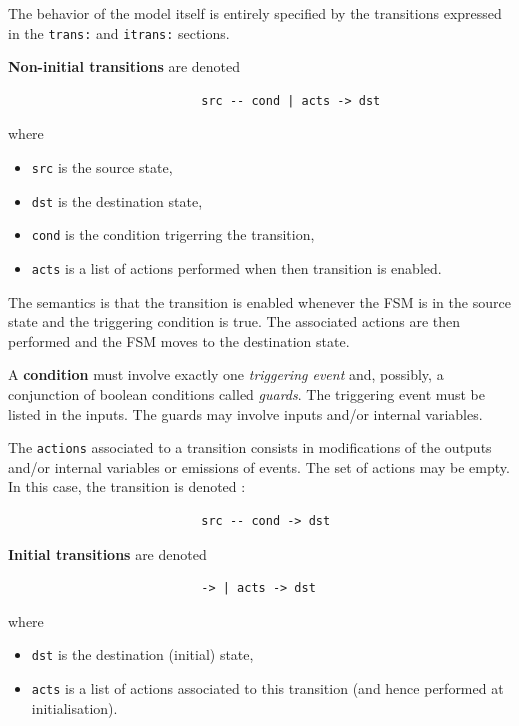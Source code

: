 The behavior of the model itself is entirely specified by the transitions expressed in the
\verb|trans:| and \verb|itrans:| sections.

\medskip
\textbf{Non-initial transitions} are denoted 

\begin{verbatim}
                           src -- cond | acts -> dst
\end{verbatim}

where
\begin{itemize}
\item \texttt{src} is the source state,
\item \texttt{dst} is the destination state,
\item \texttt{cond} is the condition trigerring the transition,
\item \texttt{acts} is a list of actions performed when then transition is enabled.
\end{itemize}

\medskip The semantics is that the transition is enabled whenever the FSM is in the source state and
the triggering condition is true. The associated actions are then performed and the FSM moves to the
destination state.

\medskip
A \textbf{condition} must involve exactly one \emph{triggering event} and, possibly, a conjunction of boolean
conditions called \emph{guards}. The triggering event must be listed in the inputs. The guards may
involve inputs and/or internal variables.

\medskip The \texttt{actions} associated to a transition consists in modifications of the outputs
and/or internal variables or emissions of events.  The set of actions may be empty. In this case,
the transition is denoted :

\begin{verbatim}
                           src -- cond -> dst
\end{verbatim}

\medskip
\textbf{Initial transitions} are denoted 

\begin{verbatim}
                           -> | acts -> dst
\end{verbatim}

where
\begin{itemize}
\item \texttt{dst} is the destination (initial) state,
\item \texttt{acts} is a list of actions associated to this transition (and hence performed at
  initialisation).
\end{itemize}

